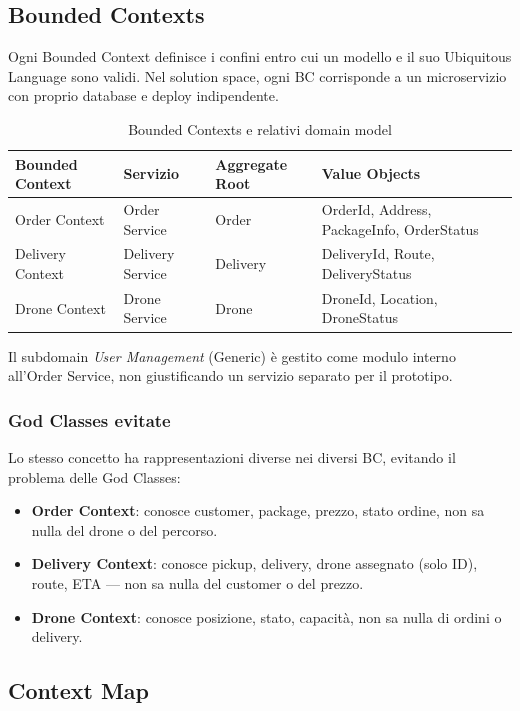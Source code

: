 \documentclass[12pt,a4paper]{article}
\begin{document}
\subsection{Bounded Contexts}

Ogni Bounded Context definisce i confini entro cui un modello e il suo Ubiquitous Language sono validi. Nel solution space, ogni BC corrisponde a un microservizio con proprio database e deploy indipendente.

\begin{table}[H]
\centering
\begin{tabularx}{\textwidth}{lllX}
\toprule
\textbf{Bounded Context} & \textbf{Servizio} & \textbf{Aggregate Root} & \textbf{Value Objects} \\
\midrule
Order Context & Order Service & Order & OrderId, Address, PackageInfo, OrderStatus \\
Delivery Context & Delivery Service & Delivery & DeliveryId, Route, DeliveryStatus \\
Drone Context & Drone Service & Drone & DroneId, Location, DroneStatus \\
\bottomrule
\end{tabularx}
\caption{Bounded Contexts e relativi domain model}
\end{table}

Il subdomain \textit{User Management} (Generic) \`e gestito come modulo interno all'Order Service, non giustificando un servizio separato per il prototipo.

\subsubsection{God Classes evitate}

Lo stesso concetto ha rappresentazioni diverse nei diversi BC, evitando il problema delle God Classes:
\begin{itemize}
    \item \textbf{Order Context}: conosce customer, package, prezzo, stato ordine, non sa nulla del drone o del percorso.
    \item \textbf{Delivery Context}: conosce pickup, delivery, drone assegnato (solo ID), route, ETA --- non sa nulla del customer o del prezzo.
    \item \textbf{Drone Context}: conosce posizione, stato, capacit\`a, non sa nulla di ordini o delivery.
\end{itemize}

\subsection{Context Map}
\end{document}
